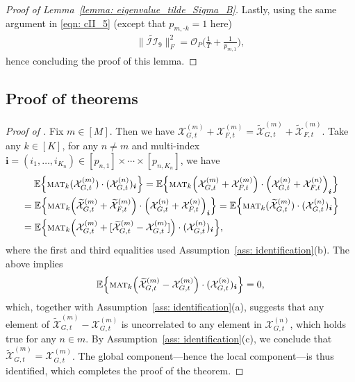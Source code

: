 \documentclass[aos]{imsart}
\theoremstyle{plain}
\theoremstyle{definition}
\def\mat{\textnormal{\textsc{mat}}}
\def\wt#1{\widetilde{#1}}
\def\E{\mathbb{E}}
\def\cII{\mathcal{II}}
\def\cO{\mathcal{O}}
\def\cX{\mathcal{X}}
\def\bi{\boldsymbol{i}}
\begin{document}
\begin{proof}[Proof of Lemma~\ref{lemma: eigenvalue_tilde_Sigma_B}]
Lastly, using the same argument in \eqref{eqn: cII_5} (except that $p_{m,\text{-}k}=1$ here) \begin{align}
    &\;\quad
    \|\wt\cII_9\|_F^2 = \cO_P\Big( \frac{1}{T} + \frac{1}{p_{m,1}} \Big) ,
    \label{eqn: tilde_cII_9}
\end{align}
hence concluding the proof of this lemma.
\end{proof}









\subsection{Proof of theorems}


\begin{proof}[Proof of ]
Fix $m\in[M]$. Then we have $\cX_{G,t}^{(m)} + \cX_{F,t}^{(m)} = \wt\cX_{G,t}^{(m)} + \wt\cX_{F,t}^{(m)}$. Take any $k\in[K]$, for any $n\neq m$ and multi-index $\bi=(i_1,\ldots,i_{K_n}) \in [p_{n,1}] \times \cdots \times[p_{n,K_n}]$, we have
\begin{align*}
    &\;\quad
    \E\Big\{ \mat_k(\cX_{G,t}^{(m)}) \cdot (\cX_{G,t}^{(n)})_{\bi} \Big\}
    = \E\Big\{ \mat_k\Big( \cX_{G,t}^{(m)} +\cX_{F,t}^{(m)} \Big) \cdot \Big( \cX_{G,t}^{(n)} +\cX_{F,t}^{(n)} \Big)_{\bi} \Big\} \\
    &=
    \E\Big\{ \mat_k\Big( \wt\cX_{G,t}^{(m)} +\wt\cX_{F,t}^{(m)} \Big) \cdot \Big( \cX_{G,t}^{(n)} +\cX_{F,t}^{(n)} \Big)_{\bi} \Big\}
    = \E\Big\{ \mat_k(\wt\cX_{G,t}^{(m)}) \cdot (\cX_{G,t}^{(n)})_{\bi} \Big\} \\
    &=
    \E\Big\{ \mat_k\Big( \cX_{G,t}^{(m)} + [\wt\cX_{G,t}^{(m)} - \cX_{G,t}^{(m)}] \Big) \cdot (\cX_{G,t}^{(n)})_{\bi} \Big\} ,
\end{align*}
where the first and third equalities used Assumption~\ref{ass: identification}(b). The above implies
\[
\E\Big\{ \mat_k\Big( \wt\cX_{G,t}^{(m)} - \cX_{G,t}^{(m)} \Big) \cdot (\cX_{G,t}^{(n)})_{\bi} \Big\} = 0 ,
\]
which, together with Assumption~\ref{ass: identification}(a), suggests that any element of $\wt\cX_{G,t}^{(m)} - \cX_{G,t}^{(m)}$ is uncorrelated to any element in $\cX_{G,t}^{(n)}$, which holds true for any $n\in m$. By Assumption~\ref{ass: identification}(c), we conclude that $\wt\cX_{G,t}^{(m)} = \cX_{G,t}^{(m)}$. The global component---hence the local component---is thus identified, which completes the proof of the theorem.
\end{proof}
\end{document}
